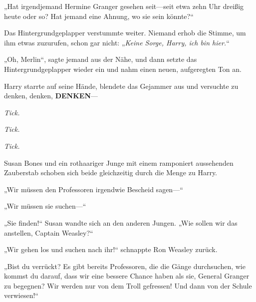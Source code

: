 „Hat irgendjemand Hermine Granger gesehen seit—seit etwa zehn Uhr dreißig heute oder so? Hat jemand eine Ahnung, wo sie sein könnte?“


Das Hintergrundgeplapper verstummte weiter. Niemand erhob die Stimme, um ihm etwas zuzurufen, schon gar nicht: „\emph{Keine Sorge, Harry, ich bin hier.}“

„Oh, Merlin“, sagte jemand aus der Nähe, und dann setzte das Hintergrundgeplapper wieder ein und nahm einen neuen, aufgeregten Ton an.

Harry starrte auf seine Hände, blendete das Gejammer aus und versuchte zu denken, denken, \textbf{DENKEN}—

\emph{Tick.}

\emph{Tick.}

\emph{Tick.}

Susan Bones und ein rothaariger Junge mit einem ramponiert aussehenden Zauberstab schoben sich beide gleichzeitig durch die Menge zu Harry.

„Wir müssen den Professoren irgendwie Bescheid sagen—“

„Wir müssen sie suchen—“

„Sie finden!“ Susan wandte sich an den anderen Jungen. „Wie sollen wir das anstellen, Captain Weasley?“

„Wir gehen los und suchen nach ihr!“ schnappte Ron Weasley zurück.

„Bist du verrückt? Es gibt bereits Professoren, die die Gänge durchsuchen, wie kommst du darauf, dass wir eine bessere Chance haben als sie, General Granger zu begegnen? Wir werden nur von dem Troll gefressen! Und dann von der Schule verwiesen!“

